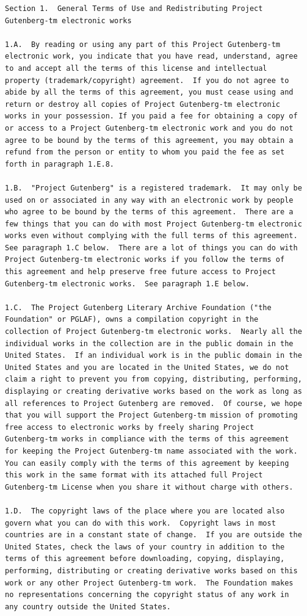 \documentclass{book}[2004/02/16]
\begin{document}
\begin{verbatim}
Section 1.  General Terms of Use and Redistributing Project
Gutenberg-tm electronic works

1.A.  By reading or using any part of this Project Gutenberg-tm
electronic work, you indicate that you have read, understand, agree
to and accept all the terms of this license and intellectual
property (trademark/copyright) agreement.  If you do not agree to
abide by all the terms of this agreement, you must cease using and
return or destroy all copies of Project Gutenberg-tm electronic
works in your possession. If you paid a fee for obtaining a copy of
or access to a Project Gutenberg-tm electronic work and you do not
agree to be bound by the terms of this agreement, you may obtain a
refund from the person or entity to whom you paid the fee as set
forth in paragraph 1.E.8.

1.B.  "Project Gutenberg" is a registered trademark.  It may only be
used on or associated in any way with an electronic work by people
who agree to be bound by the terms of this agreement.  There are a
few things that you can do with most Project Gutenberg-tm electronic
works even without complying with the full terms of this agreement.
See paragraph 1.C below.  There are a lot of things you can do with
Project Gutenberg-tm electronic works if you follow the terms of
this agreement and help preserve free future access to Project
Gutenberg-tm electronic works.  See paragraph 1.E below.

1.C.  The Project Gutenberg Literary Archive Foundation ("the
Foundation" or PGLAF), owns a compilation copyright in the
collection of Project Gutenberg-tm electronic works.  Nearly all the
individual works in the collection are in the public domain in the
United States.  If an individual work is in the public domain in the
United States and you are located in the United States, we do not
claim a right to prevent you from copying, distributing, performing,
displaying or creating derivative works based on the work as long as
all references to Project Gutenberg are removed.  Of course, we hope
that you will support the Project Gutenberg-tm mission of promoting
free access to electronic works by freely sharing Project
Gutenberg-tm works in compliance with the terms of this agreement
for keeping the Project Gutenberg-tm name associated with the work.
You can easily comply with the terms of this agreement by keeping
this work in the same format with its attached full Project
Gutenberg-tm License when you share it without charge with others.

1.D.  The copyright laws of the place where you are located also
govern what you can do with this work.  Copyright laws in most
countries are in a constant state of change.  If you are outside the
United States, check the laws of your country in addition to the
terms of this agreement before downloading, copying, displaying,
performing, distributing or creating derivative works based on this
work or any other Project Gutenberg-tm work.  The Foundation makes
no representations concerning the copyright status of any work in
any country outside the United States.


\end{verbatim}
\end{document}
